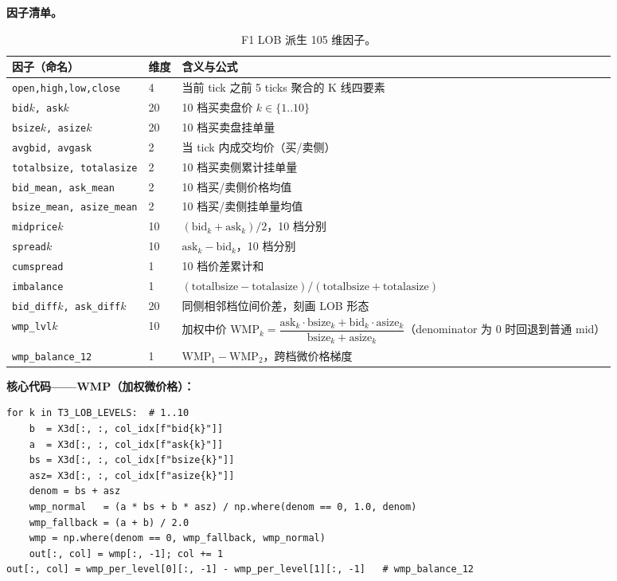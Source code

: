 \documentclass[10.5pt,a4paper]{article}
\begin{document}
\textbf{因子清单。}
\begin{table}[H]
\centering\small
\begin{tabular}{p{} p{} p{}}
\toprule
因子（命名） & 维度 & 含义与公式 \\
\midrule
\texttt{open,high,low,close} & 4 & 当前 tick 之前 5 ticks 聚合的 K 线四要素 \\
\texttt{bid$k$, ask$k$} & 20 & 10 档买卖盘价 $k\in\{1..10\}$ \\
\texttt{bsize$k$, asize$k$} & 20 & 10 档买卖盘挂单量 \\
\texttt{avgbid, avgask} & 2 & 当 tick 内成交均价（买/卖侧） \\
\texttt{totalbsize, totalasize} & 2 & 10 档买卖侧累计挂单量 \\
\texttt{bid\_mean, ask\_mean} & 2 & 10 档买/卖侧价格均值 \\
\texttt{bsize\_mean, asize\_mean} & 2 & 10 档买/卖侧挂单量均值 \\
\texttt{midprice$k$} & 10 & $(\mathrm{bid}_k + \mathrm{ask}_k)/2$，10 档分别 \\
\texttt{spread$k$} & 10 & $\mathrm{ask}_k - \mathrm{bid}_k$，10 档分别 \\
\texttt{cumspread} & 1 & 10 档价差累计和 \\
\texttt{imbalance} & 1 & $(\mathrm{totalbsize}-\mathrm{totalasize})/(\mathrm{totalbsize}+\mathrm{totalasize})$ \\
\texttt{bid\_diff$k$, ask\_diff$k$} & 20 & 同侧相邻档位间价差，刻画 LOB 形态 \\
\texttt{wmp\_lvl$k$} & 10 & 加权中价 $\mathrm{WMP}_k = \dfrac{\mathrm{ask}_k\cdot\mathrm{bsize}_k + \mathrm{bid}_k\cdot\mathrm{asize}_k}{\mathrm{bsize}_k+\mathrm{asize}_k}$（denominator 为 0 时回退到普通 mid） \\
\texttt{wmp\_balance\_12} & 1 & $\mathrm{WMP}_1 - \mathrm{WMP}_2$，跨档微价格梯度 \\
\bottomrule
\end{tabular}
\caption{F1 LOB 派生 105 维因子。}
\end{table}

\textbf{核心代码——WMP（加权微价格）：}
\begin{lstlisting}
for k in T3_LOB_LEVELS:  # 1..10
    b  = X3d[:, :, col_idx[f"bid{k}"]]
    a  = X3d[:, :, col_idx[f"ask{k}"]]
    bs = X3d[:, :, col_idx[f"bsize{k}"]]
    asz= X3d[:, :, col_idx[f"asize{k}"]]
    denom = bs + asz
    wmp_normal   = (a * bs + b * asz) / np.where(denom == 0, 1.0, denom)
    wmp_fallback = (a + b) / 2.0
    wmp = np.where(denom == 0, wmp_fallback, wmp_normal)
    out[:, col] = wmp[:, -1]; col += 1
out[:, col] = wmp_per_level[0][:, -1] - wmp_per_level[1][:, -1]   # wmp_balance_12
\end{lstlisting}
\end{document}
